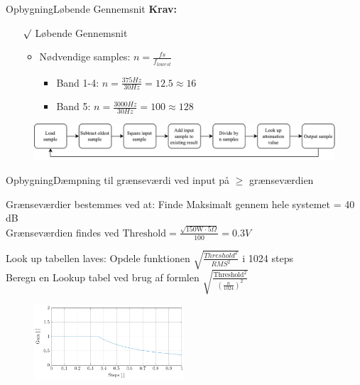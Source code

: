 \begin{frame}{Opbygning}{Løbende Gennemsnit}
\textbf{Krav:}
\begin{itemize}
\item[$\surd$] Løbende Gennemsnit
\begin{itemize}
\item Nødvendige samples: $n = \frac{fs}{f_{lowest}}$
\begin{itemize}
\item Band 1-4: $n = \frac{375 Hz}{30 Hz} = 12.5 \approx 16$
\item Band 5: $n = \frac{3000 Hz}{30 Hz} = 100 \approx 128$
\end{itemize}
\end{itemize}
\end{itemize}
\begin{figure}
\includegraphics[width=1\textwidth]{Compressor}
\end{figure} 
\end{frame}


\begin{frame}{Opbygning}{Dæmpning til grænseværdi ved input på $\geq$ grænseværdien}
\begin{block}{Grænseværdier bestemmes ved at:}
Finde Maksimalt gennem hele systemet = 40 dB \\
Grænseværdien findes ved $\text{Threshold} = \frac{\sqrt{150 \text{W} \cdot 5 \Omega}}{100}=0.3 V$
\end{block}

\begin{block}{Look up tabellen laves:}
Opdele funktionen $\sqrt{\frac{Threshold^2}{RMS^2}}$ i 1024 steps \\

Beregn en Lookup tabel ved brug af formlen $\sqrt{\frac{\text{Threshold}^2}{(\frac{n}{1024})^2}}$
\end{block}
\begin{figure}
\centering
\includegraphics[width=0.5\textwidth]{LookUP}
\end{figure}



\end{frame}


